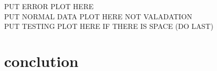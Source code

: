 \documentclass{IEEEtran}[11pt]
\begin{document}
\begin{flushleft}
  PUT ERROR PLOT HERE
  \\
  \vspace{5mm}
  PUT NORMAL DATA PLOT HERE NOT VALADATION
  \\
  \vspace{5mm}
  PUT TESTING PLOT HERE IF THERE IS SPACE (DO LAST)
\end{flushleft}

\section{conclution}
\end{document}
